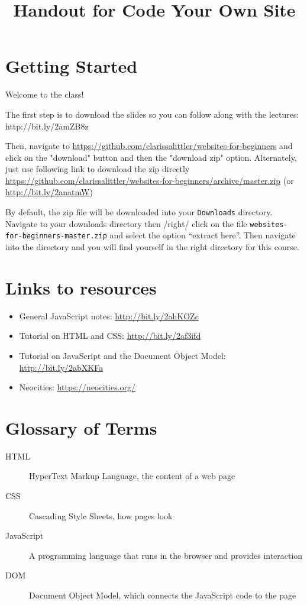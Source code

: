 \documentclass[letterpage,foldmark,10pt]{leaflet}
\title{Handout for Code Your Own Site}
\author{}
\date{}
\begin{document}
\maketitle
\section{Getting Started}
  Welcome to the class!

  The first step is to download the slides so you can follow along with the lectures: http://bit.ly/2amZB8z

    Then, navigate to \url{https://github.com/clarissalittler/websites-for-beginners} and click on the "download" button and then the "download zip" option. Alternately, just use following link to download the zip directly \url{https://github.com/clarissalittler/websites-for-beginners/archive/master.zip} (or \url{http://bit.ly/2anatmW})

\begin{framed}
  By default, the zip file will be downloaded into your \verb"Downloads" directory. Navigate to your downloads directory then /right/ click on the file \verb"websites-for-beginners-master.zip" and select the option ``extract here''. Then navigate into the directory and you will find yourself in the right directory for this course.
\end{framed}

\section{Links to resources}
\begin{itemize}
  \item General JavaScript notes: \url{http://bit.ly/2ahKOZc}
  \item Tutorial on HTML and CSS: \url{http://bit.ly/2af3ifd}
  \item Tutorial on JavaScript and the Document Object Model: \url{http://bit.ly/2abXKFa}
  \item Neocities: \url{https://neocities.org/}
\end{itemize}

\section{Glossary of Terms}
\begin{description}
  \item [HTML] HyperText Markup Language, the content of a web page
  \item [CSS] Cascading Style Sheets, how pages look
  \item [JavaScript] A programming language that runs in the browser and provides interaction
  \item [DOM] Document Object Model, which connects the JavaScript code to the page
\end{description}
\end{document}
